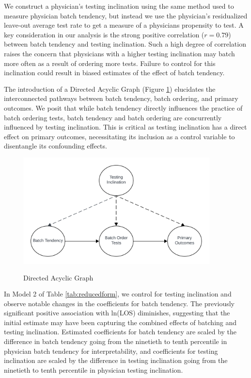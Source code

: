 \documentclass[,,nonblindrev]{informs}
\begin{document}
We construct a physician's testing inclination using the same method
used to measure physician batch tendency, but instead we use the
physician's residualized leave-out average test rate to get a measure of
a physicians propensity to test. A key consideration in our analysis is
the strong positive correlation (\(r = 0.79\)) between batch tendency
and testing inclination. Such a high degree of correlation raises the
concern that physicians with a higher testing inclination may batch more
often as a result of ordering more tests. Failure to control for this
inclination could result in biased estimates of the effect of batch
tendency.

The introduction of a Directed Acyclic Graph (Figure \ref{fig:DAG})
elucidates the interconnected pathways between batch tendency, batch
ordering, and primary outcomes. We posit that while batch tendency
directly influences the practice of batch ordering tests, batch tendency
and batch ordering are concurrently influenced by testing inclination.
This is critical as testing inclination has a direct effect on primary
outcomes, necessitating its inclusion as a control variable to
disentangle its confounding effects.

\begin{figure}[h]
  \centering
  \caption{Directed Acyclic Graph}
  \label{fig:DAG}
  \includegraphics[width=4in]{../outputs/figures/DAG.png}
\begin{tablenotes}
\small
\item \textit{}
\end{tablenotes}  
\end{figure}

In Model 2 of Table \ref{tab:reducedform}, we control for testing
inclination and observe notable changes in the coefficients for batch
tendency. The previously significant positive association with ln(LOS)
diminishes, suggesting that the initial estimate may have been capturing
the combined effects of batching and testing inclination. Estimated
coefficients for batch tendency are scaled by the difference in batch
tendency going from the ninetieth to tenth percentile in physician batch
tendency for interpretability, and coefficients for testing inclination
are scaled by the difference in testing inclination going from the
ninetieth to tenth percentile in physician testing inclination.
\end{document}
